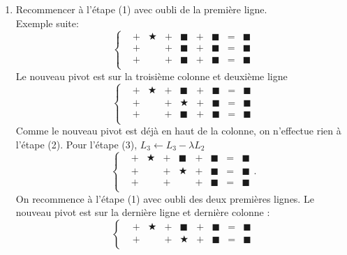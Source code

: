 \documentclass[a4paper]{book}
\begin{document}
\begin{Algorithme}
\begin{enumerate}
$${\begin{matrix}
&+&&+&\blacksquare&+&\blacksquare&=&\blacksquare\\
&+&\blacksquare&+&\blacksquare&+&\blacksquare&=&\blacksquare\\
\end{matrix}}\right.$$
On effectue $L_3\leftarrow L_3 -\lambda L_1$
$$\left\{{\begin{matrix}
&+&\bigstar&+&\blacksquare&+&\blacksquare&=&\blacksquare\\
&+&&+&\blacksquare&+&\blacksquare&=&\blacksquare\\
&+&&+&\blacksquare&+&\blacksquare&=&\blacksquare\\
\end{matrix}}\right.$$
\item Recommencer à l'étape (1) avec oubli de la première ligne.\\
Exemple suite: 
$$\left\{{\begin{matrix}
&+&\bigstar&+&\blacksquare&+&\blacksquare&=&\blacksquare\\
&+&&+&\blacksquare&+&\blacksquare&=&\blacksquare\\
&+&&+&\blacksquare&+&\blacksquare&=&\blacksquare\\
\end{matrix}}\right.$$
Le nouveau pivot est sur la troisième colonne et deuxième ligne
$$\left\{{\begin{matrix}
&+&\bigstar&+&\blacksquare&+&\blacksquare&=&\blacksquare\\
&+&&+&\bigstar&+&\blacksquare&=&\blacksquare\\
&+&&+&\blacksquare&+&\blacksquare&=&\blacksquare\\
\end{matrix}}\right.$$
Comme le nouveau pivot est déjà en haut de la colonne, on n'effectue rien à l'étape (2). Pour l'étape (3),  $L_3\leftarrow L_3 -\lambda L_2$
$$\left\{{\begin{matrix}
&+&\bigstar&+&\blacksquare&+&\blacksquare&=&\blacksquare\\
&+&&+&\bigstar&+&\blacksquare&=&\blacksquare\\
&+&&+&&+&\blacksquare&=&\blacksquare\\
\end{matrix}}\right. .$$ On recommence à l'étape (1) avec oubli des deux premières lignes. Le nouveau pivot est sur la dernière ligne et dernière colonne :
$$\left\{{\begin{matrix}
&+&\bigstar&+&\blacksquare&+&\blacksquare&=&\blacksquare\\
&+&&+&\bigstar&+&\blacksquare&=&\blacksquare\\

\end{matrix}}$$
\end{enumerate}
\end{Algorithme}
\end{document}
